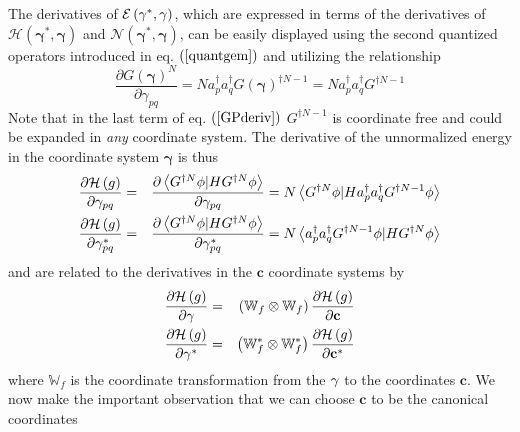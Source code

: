 \documentclass{article}
\begin{document}
The derivatives of $\mathcal{E}\left( \mathbf{\gamma }^{\ast },\mathbf{%
\gamma }\right) $, which are expressed in terms of the derivatives of $%
\mathcal{H}\left( \mathbf{\gamma }^{\ast },\mathbf{\gamma }\right) $ and $%
\mathcal{N}\left( \mathbf{\gamma }^{\ast },\mathbf{\gamma }\right) $, can be
easily displayed using the second quantized operators introduced in eq. $%
\left( \ref{quantgem}\right) $ and utilizing the relationship 
\begin{equation}
\frac{\partial G\left( \mathbf{\gamma }\right) ^{N}}{\partial \gamma _{pq}}%
=Na_{p}^{\dagger }a_{q}^{\dagger }G\left( \mathbf{\gamma }\right) ^{\dagger
N-1}=Na_{p}^{\dagger }a_{q}^{\dagger }G^{\dagger N-1}  \label{GPderiv}
\end{equation}%
Note that in the last term of eq. $\left( \ref{GPderiv}\right) $ $G^{\dagger
N-1}$ is coordinate free and could be expanded in \emph{any }coordinate
system. The derivative of the unnormalized energy in the coordinate system $%
\mathbf{\gamma }$ is thus 
\begin{eqnarray}
\frac{\partial \mathcal{H}\left( g\right) }{\partial \gamma _{pq}} &=&\frac{%
\partial \left\langle G^{\dagger N}\phi |HG^{\dagger N}\phi \right\rangle }{%
\partial \gamma _{pq}}=N\left\langle G^{\dagger N}\phi |Ha_{p}^{\dagger
}a_{q}^{\dagger }G^{\dagger N-1}\phi \right\rangle  \notag \\
\frac{\partial \mathcal{H}\left( g\right) }{\partial \gamma _{pq}^{\ast }}
&=&\frac{\partial \left\langle G^{\dagger N}\phi |HG^{\dagger N}\phi
\right\rangle }{\partial \gamma _{pq}^{\ast }}=N\left\langle a_{p}^{\dagger
}a_{q}^{\dagger }G^{\dagger N-1}\phi |HG^{\dagger N}\phi \right\rangle
\end{eqnarray}%
and are related to the derivatives in the $\mathbf{c}$ coordinate systems by 
\begin{eqnarray}
\frac{\partial \mathcal{H}\left( g\right) }{\partial \mathbf{\gamma }}
&=&\left( \mathbb{W}_{f}\otimes \mathbb{W}_{f}\right) \frac{\partial 
\mathcal{H}\left( g\right) }{\partial \mathbf{c}}  \notag \\
\frac{\partial \mathcal{H}\left( g\right) }{\partial \mathbf{\gamma }^{\ast }%
} &=&\left( \mathbb{W}_{f}^{\ast }\otimes \mathbb{W}_{f}^{\ast }\right) 
\frac{\partial \mathcal{H}\left( g\right) }{\partial \mathbf{c}^{\ast }}
\label{gamder}
\end{eqnarray}%
where $\mathbb{W}_{f}$ is the coordinate transformation from the $\mathbf{%
\gamma } $ to the coordinates $\mathbf{c}$. We now make the important
observation that we can choose $\mathbf{c}$ to be the canonical coordinates
\end{document}
